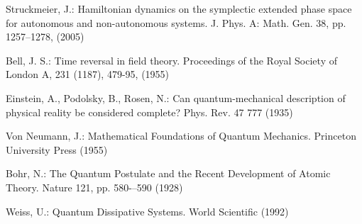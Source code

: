 \documentclass[smallextended]{svjour3}
\numberwithin{equation}{section}
\theoremstyle{definition}
\begin{document}
\begin{thebibliography}{0}
 Struckmeier, J.: Hamiltonian dynamics on the symplectic extended phase space for autonomous and non-autonomous systems. J. Phys. A: Math. Gen. 38, pp. 1257--1278, (2005)


 Bell, J. S.: Time reversal in field theory. Proceedings of the Royal Society of London A, 231 (1187), 479-95, (1955)

 Einstein, A., Podolsky, B.,  Rosen, N.: Can quantum-mechanical description of physical reality be considered complete? Phys. Rev. 47 777 (1935)

 Von Neumann, J.: Mathematical Foundations of Quantum Mechanics. Princeton University Press (1955)

 Bohr, N.: The Quantum Postulate and the Recent Development of Atomic Theory. Nature 121, pp. 580-–590 (1928)

 Weiss, U.: Quantum Dissipative Systems. World Scientific (1992)
\end{thebibliography}
\end{document}

